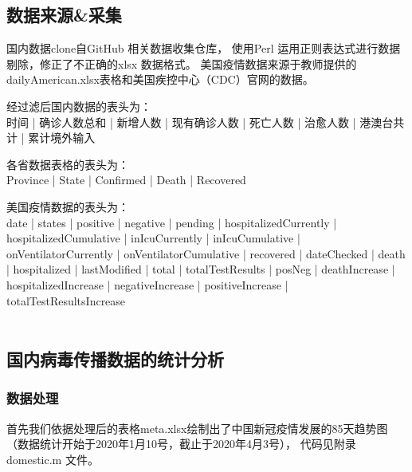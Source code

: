 \documentclass[UTF8]{ctexart}
\begin{document}
\subsection{数据来源\&采集}
国内数据clone自GitHub 相关数据收集仓库\cite{bib1}，
使用Perl 运用正则表达式进行数据剔除，修正了不正确的xlsx 数据格式。
美国疫情数据来源于教师提供的dailyAmerican.xlsx表格和美国疾控中心（CDC）官网\cite{usaCdc}的数据。
\\
\par 经过滤后国内数据的表头为：
\\
 时间 | 确诊人数总和 | 新增人数 | 现有确诊人数 |
死亡人数 | 治愈人数	 | 港澳台共计 | 累计境外输入
\\
\par 各省数据表格的表头为：
\\
Province | State | Confirmed | Death | Recovered
\\
\par 美国疫情数据的表头为：
\\
date | states | positive | negative | pending | hospitalizedCurrently | hospitalizedCumulative | inIcuCurrently | inIcuCumulative | onVentilatorCurrently | onVentilatorCumulative | recovered | dateChecked | death | hospitalized | lastModified | total | totalTestResults | posNeg | deathIncrease | hospitalizedIncrease | negativeIncrease | positiveIncrease | totalTestResultsIncrease 
\\\hspace*{\fill}\\
\subsection{国内病毒传播数据的统计分析}

\subsubsection{数据处理}
首先我们依据处理后的表格meta.xlsx绘制出了中国新冠疫情发展的85天趋势图
（数据统计开始于2020年1月10号，截止于2020年4月3号），
代码见附录domestic.m 文件。
\end{document}
